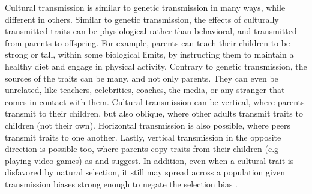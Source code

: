 \documentclass[11pt]{article}
\begin{document}
Cultural transmission is similar to genetic transmission in many ways, while different in others.
Similar to genetic transmission, the effects of culturally transmitted traits can be physiological rather than behavioral, and transmitted from parents to offspring.
 For example, parents can teach their children to be strong or tall, within some biological limits, by instructing them to maintain a healthy diet and engage in physical activity.
Contrary to genetic transmission, the sources of the traits can be many, and not only parents. They can even be unrelated, like teachers, celebrities, coaches, the media, or any stranger that comes in contact with them. 
 Cultural transmission can be vertical, where parents transmit to their children, but also oblique, where other adults transmit traits to children (not their own).
  Horizontal transmission is also possible, where peers transmit traits to one another. 
   Lastly, vertical transmission in the opposite direction is possible too, where parents copy traits from their children (e.g playing video games) as \citet{transmissionVectorsBook} and \citet{transmissionVectors} suggest. 
In addition, even when a cultural trait is disfavored by natural selection, it still may spread across a population given transmission biases strong enough to negate the selection bias \citep[Ch. 8 pg. 279]{evolutionBook}.\\ 
\end{document}
